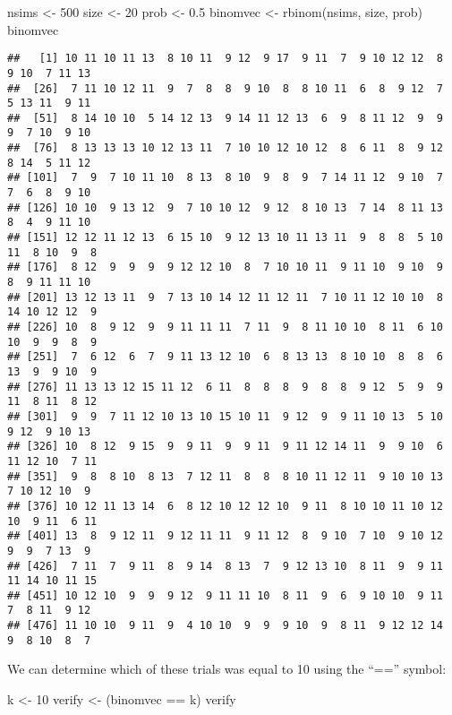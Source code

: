 \documentclass[
]{book}
\newenvironment{Shaded}{\begin{snugshade}}{\end{snugshade}}
\newcommand{\DecValTok}[1]{\textcolor[rgb]{0.00,0.00,0.81}{#1}}
\newcommand{\FloatTok}[1]{\textcolor[rgb]{0.00,0.00,0.81}{#1}}
\newcommand{\FunctionTok}[1]{\textcolor[rgb]{0.00,0.00,0.00}{#1}}
\newcommand{\NormalTok}[1]{#1}
\newcommand{\OtherTok}[1]{\textcolor[rgb]{0.56,0.35,0.01}{#1}}
\newcommand{\SpecialCharTok}[1]{\textcolor[rgb]{0.00,0.00,0.00}{#1}}
\begin{document}
\begin{Shaded}
\begin{Highlighting}[]
\NormalTok{nsims }\OtherTok{\textless{}{-}} \DecValTok{500}
\NormalTok{size }\OtherTok{\textless{}{-}} \DecValTok{20}
\NormalTok{prob }\OtherTok{\textless{}{-}} \FloatTok{0.5}
\NormalTok{binomvec }\OtherTok{\textless{}{-}} \FunctionTok{rbinom}\NormalTok{(nsims, size, prob)}
\NormalTok{binomvec}
\end{Highlighting}
\end{Shaded}

\begin{verbatim}
##   [1] 10 11 10 11 13  8 10 11  9 12  9 17  9 11  7  9 10 12 12  8  9 10  7 11 13
##  [26]  7 11 10 12 11  9  7  8  8  9 10  8  8 10 11  6  8  9 12  7  5 13 11  9 11
##  [51]  8 14 10 10  5 14 12 13  9 14 11 12 13  6  9  8 11 12  9  9  9  7 10  9 10
##  [76]  8 13 13 13 10 12 13 11  7 10 10 12 10 12  8  6 11  8  9 12  8 14  5 11 12
## [101]  7  9  7 10 11 10  8 13  8 10  9  8  9  7 14 11 12  9 10  7  7  6  8  9 10
## [126] 10 10  9 13 12  9  7 10 10 12  9 12  8 10 13  7 14  8 11 13  8  4  9 11 10
## [151] 12 12 11 12 13  6 15 10  9 12 13 10 11 13 11  9  8  8  5 10 11  8 10  9  8
## [176]  8 12  9  9  9  9 12 12 10  8  7 10 10 11  9 11 10  9 10  9  8  9 11 11 10
## [201] 13 12 13 11  9  7 13 10 14 12 11 12 11  7 10 11 12 10 10  8 14 10 12 12  9
## [226] 10  8  9 12  9  9 11 11 11  7 11  9  8 11 10 10  8 11  6 10 10  9  9  8  9
## [251]  7  6 12  6  7  9 11 13 12 10  6  8 13 13  8 10 10  8  8  6 13  9  9 10  9
## [276] 11 13 13 12 15 11 12  6 11  8  8  8  9  8  8  9 12  5  9  9 11  8 11  8 12
## [301]  9  9  7 11 12 10 13 10 15 10 11  9 12  9  9 11 10 13  5 10  9 12  9 10 13
## [326] 10  8 12  9 15  9  9 11  9  9 11  9 11 12 14 11  9  9 10  6 11 12 10  7 11
## [351]  9  8  8 10  8 13  7 12 11  8  8  8 10 11 12 11  9 10 10 13  7 10 12 10  9
## [376] 10 12 11 13 14  6  8 12 10 12 12 10  9 11  8 10 10 11 10 12 10  9 11  6 11
## [401] 13  8  9 12 11  9 12 11 11  9 11 12  8  9 10  7 10  9 10 12  9  9  7 13  9
## [426]  7 11  7  9 11  8  9 14  8 13  7  9 12 13 10  8 11  9  9 11 11 14 10 11 15
## [451] 10 12 10  9  9  9 12  9 11 11 10  8 11  9  6  9 10 10  9 11  7  8 11  9 12
## [476] 11 10 10  9 11  9  4 10 10  9  9  9 10  9  8 11  9 12 12 14  9  8 10  8  7
\end{verbatim}

We can determine which of these trials was equal to 10 using the ``=='' symbol:

\begin{Shaded}
\begin{Highlighting}[]
\NormalTok{k }\OtherTok{\textless{}{-}} \DecValTok{10}
\NormalTok{verify }\OtherTok{\textless{}{-}}\NormalTok{ (binomvec }\SpecialCharTok{==}\NormalTok{ k)}
\NormalTok{verify}
\end{Highlighting}
\end{Shaded}
\end{document}
